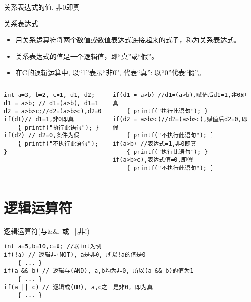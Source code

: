 \begin{frame}{关系表达式的值, 非0即真}
\vspace{-0.2cm}
\begin{block}{关系表达式}
	\small
	\begin{itemize}
		\item 用关系运算符将两个数值或数值表达式连接起来的式子，称为关系表达式。
		\item 关系表达式的值是一个逻辑值，即``真''或``假''。
		\item 在C的逻辑运算中, 以``1''表示``非0'', 代表``真''; 以``0''代表``假''。	
	\end{itemize}
\end{block}
\vspace{-0.5cm}
\begin{columns}[T]
\begin{lstlisting}
int a=3, b=2, c=1, d1, d2; 
d1 = a>b; // d1=(a>b), d1=1
d2 = a>b>c;//d2=(a>b>c),d2=0
if(d1)// d1=1,非0即真
	{ printf("执行此语句"); }
if(d2) // d2=0,条件为假
	{ printf("不执行此语句"); }
\end{lstlisting}
\begin{lstlisting}
if(d1 = a>b) //d1=(a>b),赋值后d1=1,非0即真
	{ printf("执行此语句"); }
if(d2 = a>b>c)//d2=(a>b>c),赋值后d2=0,即假
	{ printf("不执行此语句"); }
if(a>b) //表达式=1,非0即真
	{ printf("执行此语句"); }
if(a>b>c),表达式值=0,即假
	{ printf("不执行此语句"); }
\end{lstlisting}
\end{columns}
\end{frame}

\section{逻辑运算符}

\begin{frame}{逻辑运算符(与\&\&, 或|~|,非!)}
\begin{lstlisting}
int a=5,b=10,c=0; //以int为例
if(!a) // 逻辑非(NOT), a是非0, 所以!a的值是0
	{ ... }
if(a && b) // 逻辑与(AND), a,b均为非0, 所以(a && b)的值为1
	{ ... }
if(a || c) // 逻辑或(OR), a,c之一是非0, 即为真
	{ ... }
\end{lstlisting}
\end{frame}

